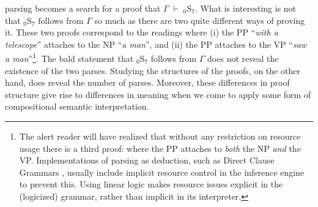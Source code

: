 parsing becomes a search for a proof that
$\Gamma \; \vdash \; _0\mbox{S}_7$.
What is interesting is not that $_0$S$_7$ follows from $\Gamma$ so
much as there are two quite different ways of proving it.  These two
proofs correspond to the readings where (i) the PP
``{\it with a telescope}'' attaches to the NP ``{\it a man}'', and
(ii) the PP attaches to the VP ``{\it saw a man}''\footnote{The alert
reader will have realized that without any restriction on resource
usage there is a third proof: where the PP attaches to {\em both} the
NP {\em and}
the VP.  Implementations of parsing as deduction, such as Direct
Clause Grammars , usually include implicit resource control
in the inference engine to prevent this.  Using linear logic makes
resource issues explicit in the (logicized) grammar, rather than
implicit in its interpreter.}.  The bald statement that $_0$S$_7$
follows from $\Gamma$ does not reveal the existence of the two parses.
Studying the structures of the proofs, on the other hand, does reveal
the number of parses.  Moreover, these differences in proof structure
give rise to differences in meaning when we come to apply some form of
compositional semantic interpretation.


